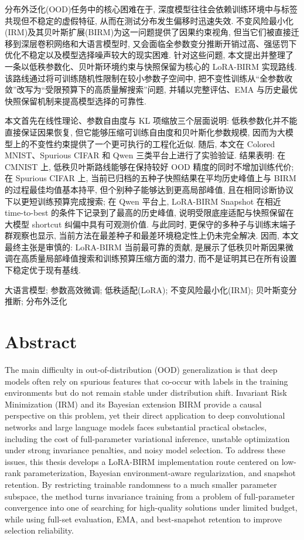 \documentclass[a4paper,punct=banjiao,twoside]{ctexrep}
\theoremstyle{plain}
\theoremstyle{definition}
\theoremstyle{remark}
\begin{document}
分布外泛化(OOD)任务中的核心困难在于, 深度模型往往会依赖训练环境中与标签共现但不稳定的虚假特征, 从而在测试分布发生偏移时迅速失效. 不变风险最小化(IRM)及其贝叶斯扩展(BIRM)为这一问题提供了因果约束视角, 但当它们被直接迁移到深层卷积网络和大语言模型时, 又会面临全参数变分推断开销过高、强惩罚下优化不稳定以及模型选择噪声较大的现实困难. 针对这些问题, 本文提出并整理了一条以低秩参数化、贝叶斯环境约束与快照保留为核心的 LoRA-BIRM 实现路线. 该路线通过将可训练随机性限制在较小参数子空间中, 把不变性训练从“全参数收敛”改写为“受限预算下的高质量解搜索”问题, 并辅以完整评估、EMA 与历史最优快照保留机制来提高模型选择的可靠性.

本文首先在线性理论、参数自由度与 KL 项缩放三个层面说明: 低秩参数化并不能直接保证因果恢复, 但它能够压缩可训练自由度和贝叶斯化参数规模, 因而为大模型上的不变性约束提供了一个更可执行的工程化近似. 随后, 本文在 Colored MNIST、Spurious CIFAR 和 Qwen 三类平台上进行了实验验证. 结果表明: 在 CMNIST 上, 低秩贝叶斯路线能够在保持较好 OOD 精度的同时不增加训练代价; 在 Spurious CIFAR 上, 当前已归档的五种子快照结果在平均历史峰值上与 BIRM 的过程最佳均值基本持平, 但个别种子能够达到更高局部峰值, 且在相同诊断协议下以更短训练预算完成搜索; 在 Qwen 平台上, LoRA-BIRM Snapshot 在相近 time-to-best 的条件下记录到了最高的历史峰值, 说明受限底座适配与快照保留在大模型 shortcut 纠偏中具有可观测价值. 与此同时, 更保守的多种子与训练末端子群观察也显示, 当前方法在最差种子和最差环境稳定性上仍未完全解决. 因而, 本文最终主张是审慎的: LoRA-BIRM 当前最可靠的贡献, 是展示了低秩贝叶斯因果微调在高质量局部峰值搜索和训练预算压缩方面的潜力, 而不是证明其已在所有设置下稳定优于现有基线.

\vspace{1em}
 大语言模型; 参数高效微调; 低秩适配(LoRA); 不变风险最小化(IRM); 贝叶斯变分推断; 分布外泛化

\chapter*{Abstract}
\normalsize

The main difficulty in out-of-distribution (OOD) generalization is that deep models often rely on spurious features that co-occur with labels in the training environments but do not remain stable under distribution shift. Invariant Risk Minimization (IRM) and its Bayesian extension BIRM provide a causal perspective on this problem, yet their direct application to deep convolutional networks and large language models faces substantial practical obstacles, including the cost of full-parameter variational inference, unstable optimization under strong invariance penalties, and noisy model selection. To address these issues, this thesis develops a LoRA-BIRM implementation route centered on low-rank parameterization, Bayesian environment-aware regularization, and snapshot retention. By restricting trainable randomness to a much smaller parameter subspace, the method turns invariance training from a problem of full-parameter convergence into one of searching for high-quality solutions under limited budget, while using full-set evaluation, EMA, and best-snapshot retention to improve selection reliability.
\end{document}
